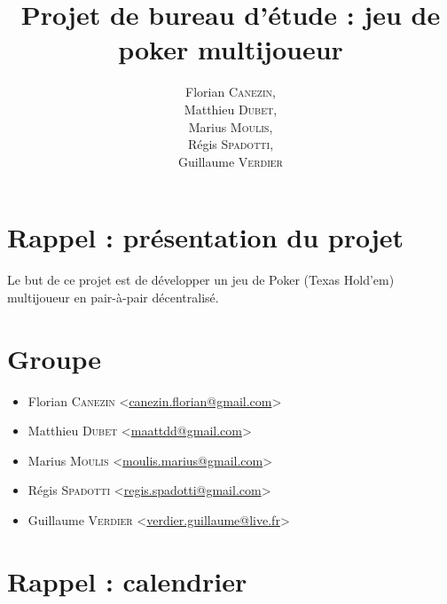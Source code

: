 \documentclass[a4paper]{article}
\title{Projet de bureau d'étude : jeu de poker multijoueur}
\author{
	Florian \textsc{Canezin},\\
	Matthieu \textsc{Dubet},\\
	Marius \textsc{Moulis},\\
	Régis \textsc{Spadotti},\\
	Guillaume \textsc{Verdier}
}
\date{}
\newcommand{\mailto}[1]{<\href{mailto:#1}{#1}>}
\begin{document}
\maketitle
\clearpage

\tableofcontents
\clearpage

\section{Rappel : présentation du projet}

Le but de ce projet est de développer un jeu de Poker (Texas Hold'em) multijoueur en pair-à-pair décentralisé.

\section{Groupe}

\begin{itemize}
	\item Florian \textsc{Canezin} \mailto{canezin.florian@gmail.com}
	\item Matthieu \textsc{Dubet} \mailto{maattdd@gmail.com}
	\item Marius \textsc{Moulis} \mailto{moulis.marius@gmail.com}
	\item Régis \textsc{Spadotti} \mailto{regis.spadotti@gmail.com}
	\item Guillaume \textsc{Verdier} \mailto{verdier.guillaume@live.fr}
\end{itemize}

\section{Rappel : calendrier}
\end{document}
